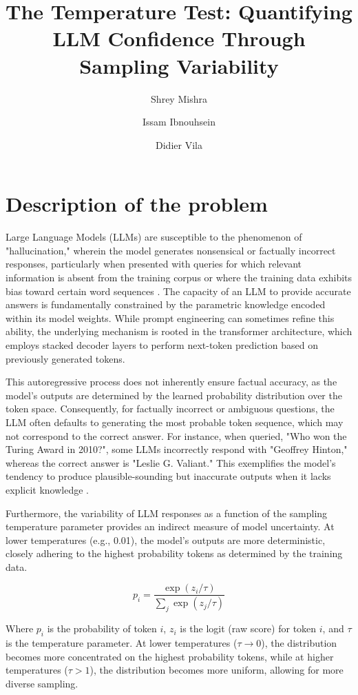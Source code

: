 \documentclass[sigconf]{acmart}
\title{The Temperature Test: Quantifying LLM Confidence Through Sampling Variability}
\author{Shrey Mishra}
\affiliation{%
  \institution{Alpha10x}
  \city{Aix en Provence}
  \country{France}
}
\author{Issam Ibnouhsein}
\affiliation{%
  \institution{Alpha10x}
  \city{Aix en Provence}
  \country{France}
}
\author{Didier Vila}
\affiliation{%
  \institution{Alpha10x}
  \city{Aix en Provence}
  \country{France}
}
\begin{document}
\maketitle

\section{Description of the problem}

Large Language Models (LLMs) are susceptible to the phenomenon of "hallucination," wherein the model generates nonsensical or factually incorrect responses, particularly when presented with queries for which relevant information is absent from the training corpus or where the training data exhibits bias toward certain word sequences \cite{hallucination_improvements}. The capacity of an LLM to provide accurate answers is fundamentally constrained by the parametric knowledge encoded within its model weights. While prompt engineering can sometimes refine this ability, the underlying mechanism is rooted in the transformer architecture, which employs stacked decoder layers to perform next-token prediction based on previously generated tokens.

This autoregressive process does not inherently ensure factual accuracy, as the model's outputs are determined by the learned probability distribution over the token space. Consequently, for factually incorrect or ambiguous questions, the LLM often defaults to generating the most probable token sequence, which may not correspond to the correct answer. For instance, when queried, "Who won the Turing Award in 2010?", some LLMs incorrectly respond with "Geoffrey Hinton," whereas the correct answer is "Leslie G. Valiant." This exemplifies the model's tendency to produce plausible-sounding but inaccurate outputs when it lacks explicit knowledge \cite{survey_hallucination}.

Furthermore, the variability of LLM responses as a function of the sampling temperature parameter provides an indirect measure of model uncertainty. At lower temperatures (e.g., 0.01), the model's outputs are more deterministic, closely adhering to the highest probability tokens as determined by the training data. 

\begin{equation}
p_i = \frac{\exp(z_i/\tau)}{\sum_j \exp(z_j/\tau)}
\end{equation}

Where $p_i$ is the probability of token $i$, $z_i$ is the logit (raw score) for token $i$, and $\tau$ is the temperature parameter. At lower temperatures ($\tau \to 0$), the distribution becomes more concentrated on the highest probability tokens, while at higher temperatures ($\tau > 1$), the distribution becomes more uniform, allowing for more diverse sampling.
\end{document}
